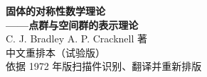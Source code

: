 \documentclass[11pt,a4paper,twoside,openright]{ctexbook}
\begin{document}
\frontmatter
\begin{titlepage}
\centering
{\Huge\bfseries 固体的对称性数学理论\\[0.6em]}
{\LARGE\bfseries ——点群与空间群的表示理论\\[3em]}
{\Large C. J. Bradley \quad A. P. Cracknell \quad 著\\[6em]}
{\large 中文重排本（试验版）\\[0.5em]}
{\large 依据 1972 年版扫描件识别、翻译并重新排版\\[4em]}
\end{titlepage}
\thispagestyle{empty}\mbox{}\clearpage
\tableofcontents
\mainmatter









\end{document}
